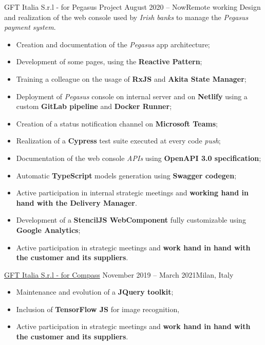 \documentclass[10pt,a4paper]{altacv}
\begin{document}
{GFT Italia S.r.l - for Pegasus Project}
{August 2020 -- Now}{Remote working}
Design and realization of the web console used by \textit{Irish banks} to manage the \textit{Pegasus payment system}.
\newline
\begin{itemize}
	\item Creation and documentation of the \textit{Pegasus} app architecture;
	\item Development of some pages, using the \textbf{Reactive Pattern};
	\item Training a colleague on the usage of \textbf{RxJS} and \textbf{Akita State Manager};
	\item Deployment of \textit{Pegasus} console on internal server and on \textbf{Netlify} using a custom \textbf{GitLab pipeline} and \textbf{Docker Runner};
	\item Creation of a status notification channel on \textbf{Microsoft Teams};
	\item Realization of a \textbf{Cypress} test suite executed at every code \textit{push};
	\item Documentation of the web console \textit{APIs} using \textbf{OpenAPI 3.0 specification};
	\item Automatic \textbf{TypeScript} models generation using \textbf{Swagger codegen};
	\item Active participation in internal strategic meetings and \textbf{working hand in hand with the Delivery Manager}.
\end{itemize}
\divider

\begin{itemize}
	\item Development of a \textbf{StencilJS WebComponent} fully customizable using \textbf{Google Analytics};
	\item Active participation in strategic meetings and \textbf{work hand in hand with the customer and its suppliers}.
\end{itemize}

\divider

{\href{https://www.compass.it/}{GFT Italia S.r.l - for Compass}}
{November 2019 -- March 2021}{Milan, Italy}
\begin{itemize}
	\item Maintenance and evolution of a \textbf{JQuery toolkit};
	\item Inclusion of \textbf{TensorFlow JS} for image recognition,
	\item Active participation in strategic meetings and \textbf{work hand in hand with the customer and its suppliers}.
\end{itemize}
\end{document}
